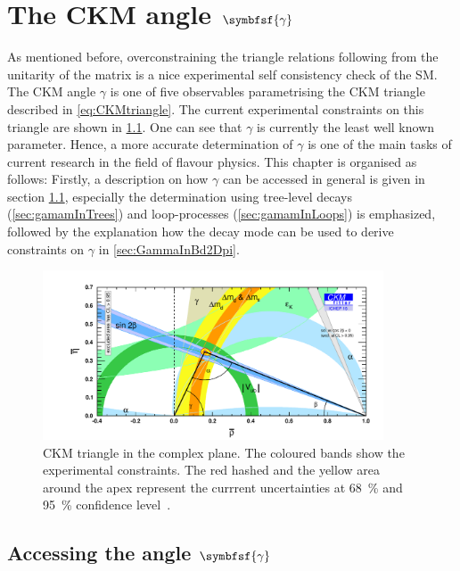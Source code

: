 \chapter[head={The CKM angle $\gamma$},tocentry={The CKM angle $\symbfsf{\gamma}$}]{The CKM angle $\symbfsf{\gamma}$}
\label{ch:CKMAngleGamma}

As mentioned before, overconstraining the triangle relations following from the unitarity of the matrix is a nice experimental self consistency check of the \ac{SM}.
The CKM angle $\gamma$ is one of five observables parametrising the CKM triangle described in \cref{eq:CKMtriangle}.
The current experimental constraints on this triangle are shown in \cref{fig:ckmtriangle}.
One can see that $\gamma$ is currently the least well known parameter.
Hence, a more accurate determination of $\gamma$ is one of the main tasks of current research in the field of flavour physics.
This chapter is organised as follows: Firstly, a description on how $\gamma$ can be accessed in general is given in section \cref{sec:accessGamma}, especially the determination using tree-level decays (\cref{sec:gamamInTrees}) and loop-processes (\cref{sec:gamamInLoops}) is emphasized, followed by the explanation how the decay mode \BdToDpi can be used to derive constraints on $\gamma$ in \cref{sec:GammaInBd2Dpi}.

\begin{figure}[tbp]
	\centering
	\includegraphics[width=0.9\textwidth]{04gamma/figs/CKMTriangle.pdf}
	\caption{CKM triangle in the complex plane.
	The coloured bands show the experimental constraints.
	The red hashed and the yellow area around the apex represent the currrent uncertainties at \SI{68}{\percent} and \SI{95}{\percent} confidence level~\cite{CKMfitter2015}.}
	\label{fig:ckmtriangle}
\end{figure}

\section[head={Accessing the angle $\gamma$},tocentry={Accessing the angle $\gamma$}]{Accessing the angle $\symbfsf{\gamma}$}
\label{sec:accessGamma}


